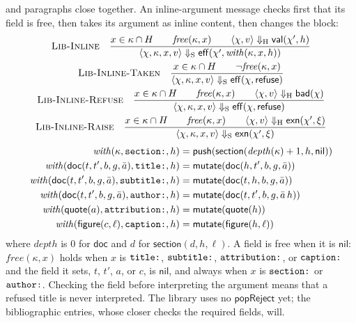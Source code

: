 \documentclass[11pt]{article}
\numberwithin{equation}{section}
\newcommand{\kw}[1]{\ensuremath{\mathsf{#1}}}
\newcommand{\str}[1]{\ensuremath{\text{\texttt{#1}}}}
\newcommand{\rulelabel}[1]{\textsc{#1}}
\begin{document}
and paragraphs close together.  An inline-argument
message checks first that its field is free, then takes its argument as
inline content, then changes the block:
\begin{gather}
\label{eq:lib-inline}
\rulelabel{Lib-Inline}\quad
\frac{x \in \kappa \cap H \qquad \mathit{free}(\kappa, x) \qquad
      \langle \chi, v \rangle \Downarrow_{\mathrm{H}} \kw{val}(\chi', h)}
     {\langle \chi, \kappa, x, v \rangle \Downarrow_{\mathrm{S}}
        \kw{eff}(\chi', \mathit{with}(\kappa, x, h))}
\\
\label{eq:lib-inline-taken}
\rulelabel{Lib-Inline-Taken}\quad
\frac{x \in \kappa \cap H \qquad \neg\mathit{free}(\kappa, x)}
     {\langle \chi, \kappa, x, v \rangle \Downarrow_{\mathrm{S}}
        \kw{eff}(\chi, \kw{refuse})}
\\
\label{eq:lib-inline-refuse}
\rulelabel{Lib-Inline-Refuse}\quad
\frac{x \in \kappa \cap H \qquad \mathit{free}(\kappa, x) \qquad
      \langle \chi, v \rangle \Downarrow_{\mathrm{H}} \kw{bad}(\chi)}
     {\langle \chi, \kappa, x, v \rangle \Downarrow_{\mathrm{S}}
        \kw{eff}(\chi, \kw{refuse})}
\\
\label{eq:lib-inline-exn}
\rulelabel{Lib-Inline-Raise}\quad
\frac{x \in \kappa \cap H \qquad \mathit{free}(\kappa, x) \qquad
      \langle \chi, v \rangle \Downarrow_{\mathrm{H}} \kw{exn}(\chi', \xi)}
     {\langle \chi, \kappa, x, v \rangle \Downarrow_{\mathrm{S}}
        \kw{exn}(\chi', \xi)}
\end{gather}
\begin{equation}\label{eq:lib-with}
\begin{aligned}
\mathit{with}(\kappa, \str{section:}, h) &=
  \kw{push}(\kw{section}(\mathit{depth}(\kappa) + 1, h, \kw{nil})) \\
\mathit{with}(\kw{doc}(t, t', b, g, \bar a), \str{title:}, h) &=
  \kw{mutate}(\kw{doc}(h, t', b, g, \bar a)) \\
\mathit{with}(\kw{doc}(t, t', b, g, \bar a), \str{subtitle:}, h) &=
  \kw{mutate}(\kw{doc}(t, h, b, g, \bar a)) \\
\mathit{with}(\kw{doc}(t, t', b, g, \bar a), \str{author:}, h) &=
  \kw{mutate}(\kw{doc}(t, t', b, g, \bar a\,h)) \\
\mathit{with}(\kw{quote}(a), \str{attribution:}, h) &=
  \kw{mutate}(\kw{quote}(h)) \\
\mathit{with}(\kw{figure}(c, \ell), \str{caption:}, h) &=
  \kw{mutate}(\kw{figure}(h, \ell))
\end{aligned}
\end{equation}
where $\mathit{depth}$ is $0$ for $\kw{doc}$ and $d$ for
$\kw{section}(d, h, \ell)$.  A field is free when it is $\kw{nil}$:
$\mathit{free}(\kappa, x)$ holds when $x$ is $\str{title:}$,
$\str{subtitle:}$, $\str{attribution:}$, or $\str{caption:}$ and the field
it sets, $t$, $t'$, $a$, or $c$, is $\kw{nil}$, and always when $x$ is
$\str{section:}$ or $\str{author:}$.  Checking the
field before interpreting the argument means that a refused title is never
interpreted.  The library uses no $\kw{popReject}$ yet; the bibliographic
entries, whose closer checks the required fields, will.
\end{document}
